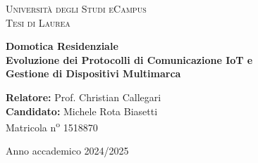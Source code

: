 \documentclass[12pt,a4paper]{report}
\begin{document}
\begin{titlepage}
    \begin{center}
        \textsc{\LARGE Universit\`a degli Studi eCampus} \\
        \vspace{0.5cm}
        \textsc{\Large Tesi di Laurea} \\
        \vspace{1.5cm}

        {\Huge \textbf{Domotica Residenziale}} \\
        \vspace{0.5cm}
        {\Large \textbf{Evoluzione dei Protocolli di Comunicazione IoT e}} \\
        \vspace{0.2cm}
        {\Large \textbf{Gestione di Dispositivi Multimarca}} \\

        \vfill
        \begin{flushleft}
            \textbf{Relatore:} Prof. Christian Callegari \\
            \textbf{Candidato:} Michele Rota Biasetti \\
            Matricola n\textsuperscript{o} 1518870
        \end{flushleft}

        \vfill
        Anno accademico 2024/2025
    \end{center}
\end{titlepage}

\tableofcontents
\newpage












\end{document}
